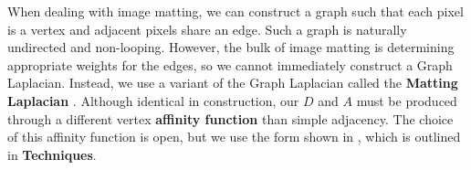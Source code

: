 When dealing with image matting, we can construct a graph such that each pixel is a vertex and adjacent pixels share an edge. Such a graph is naturally undirected and non-looping. However, the bulk of image matting is determining appropriate weights for the edges, so we cannot immediately construct a Graph Laplacian. Instead, we use a variant of the Graph Laplacian called the \textbf{Matting Laplacian} \cite{levin08}. Although identical in construction, our $D$ and $A$ must be produced through a different vertex \textbf{affinity function} than simple adjacency. The choice of this affinity function is open, but we use the form shown in \cite{levin08}, which is outlined in \textbf{Techniques}.